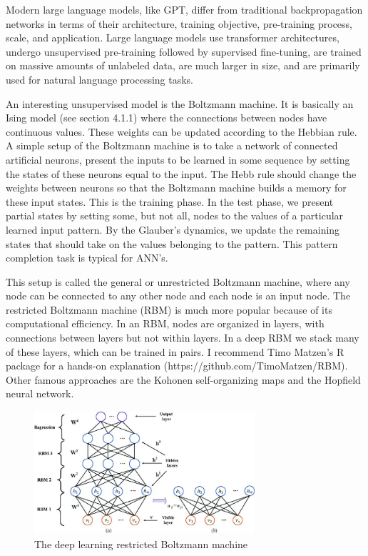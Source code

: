 \documentclass[
  letterpaper,
]{scrbook}
\begin{document}
Modern large language models, like GPT, differ from traditional
backpropagation networks in terms of their architecture, training
objective, pre-training process, scale, and application. Large language
models use transformer architectures, undergo unsupervised pre-training
followed by supervised fine-tuning, are trained on massive amounts of
unlabeled data, are much larger in size, and are primarily used for
natural language processing tasks.

An interesting unsupervised model is the Boltzmann machine. It is
basically an Ising model (see section 4.1.1) where the connections
between nodes have continuous values. These weights can be updated
according to the Hebbian rule. A simple setup of the Boltzmann machine
is to take a network of connected artificial neurons, present the inputs
to be learned in some sequence by setting the states of these neurons
equal to the input. The Hebb rule should change the weights between
neurons so that the Boltzmann machine builds a memory for these input
states. This is the training phase. In the test phase, we present
partial states by setting some, but not all, nodes to the values of a
particular learned input pattern. By the Glauber's dynamics, we update
the remaining states that should take on the values belonging to the
pattern. This pattern completion task is typical for ANN's.

This setup is called the general or unrestricted Boltzmann machine,
where any node can be connected to any other node and each node is an
input node. The restricted Boltzmann machine (RBM) is much more popular
because of its computational efficiency. In an RBM, nodes are organized
in layers, with connections between layers but not within layers. In a
deep RBM we stack many of these layers, which can be trained in pairs. I
recommend Timo Matzen's R package for a hands-on explanation
(https://github.com/TimoMatzen/RBM). Other famous approaches are the
Kohonen self-organizing maps and the Hopfield neural network.

\begin{figure}

{\centering \includegraphics[width=3.22083in,height=1.79097in]{media/ch4/image5.jpg}

}

\caption{\label{fig-ch4-img5}The deep learning restricted Boltzmann
machine}

\end{figure}
\end{document}
